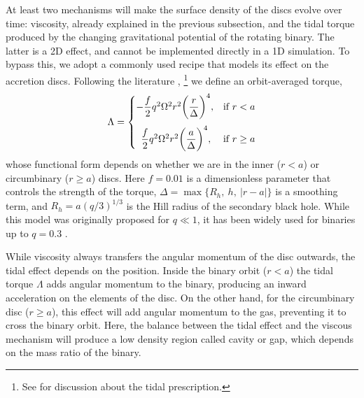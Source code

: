 \documentclass[11pt,a4paper]{article}
\begin{document}
At least two mechanisms will make the surface density of the discs
evolve over time: viscosity, already explained in the previous
subsection, and the tidal torque produced by the changing
gravitational potential of the rotating binary. The latter is a 2D
effect, and cannot be implemented directly in a 1D simulation. To
bypass this, we adopt a commonly used recipe that models its effect on
the accretion discs. Following the literature \citep{armitage02},
\footnote{See \citet{dong11a, dong11b, petrovich12, rafikov16} for
discussion about the tidal prescription.}  we define an orbit-averaged
torque,
%
\begin{align}
\Lambda = \begin{cases}
- \dfrac{f}{2} q^2 \Omega^2 r^2 \bigg(\dfrac{r}{\Delta}\bigg)^4, & \mbox{if } r < a \\[12pt]
\enskip \dfrac{f}{2} q^2 \Omega^2 r^2 \bigg(\dfrac{a}{\Delta}\bigg)^4, & \mbox{if } r \geq a \\
\end{cases}\label{eq:smooth}
\end{align}
%
whose functional form depends on whether we are in the inner ($r < a$)
or circumbinary ($r \geq a$) discs. Here $f = 0.01$ is a
dimensionless parameter that controls the strength of the torque,
$\Delta = \max \{R_h,~h,~|r - a|\}$ is a smoothing term, and $R_h = a
(q / 3)^{1 / 3}$ is the Hill radius of the secondary black hole. While
this model was originally proposed for $q \ll 1$, it has been widely
used for binaries up to $q = 0.3$ \citep{lodato09, chang10, kocsis12a,
kocsis12b, tazzari15}.

While viscosity always transfers the angular momentum of the disc
outwards, the tidal effect depends on the position. Inside the binary
orbit ($r < a$) the tidal torque $\Lambda$ adds angular momentum to
the binary, producing an inward acceleration on the elements of the
disc. On the other hand, for the circumbinary disc ($r \geq a$), this
effect will add angular momentum to the gas, preventing it to cross
the binary orbit. Here, the balance between the tidal effect and the
viscous mechanism will produce a low density region called cavity or
gap, which depends on the mass ratio of the binary.
\end{document}
